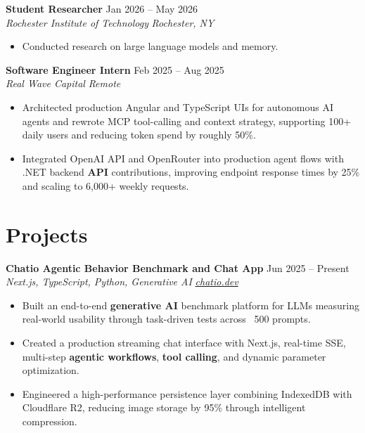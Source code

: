 \documentclass[10pt,letterpaper]{article}
\newif\ifresumeFirstRole
\newcommand{\resumeRole}[4]{%
  \ifresumeFirstRole
    \global\resumeFirstRolefalse
  \else
    \vspace{0pt plus 1fill}%
  \fi
  \textbf{#1} \hfill #2\\
  \textit{#3} \hfill \textit{#4}
}
\begin{document}
\resumeRole{Student Researcher}{Jan 2026 -- May 2026}{Rochester Institute of Technology}{Rochester, NY}
\begin{itemize}
  \item Conducted research on large language models and memory.
\end{itemize}

\resumeRole{Software Engineer Intern}{Feb 2025 -- Aug 2025}{Real Wave Capital}{Remote}
\begin{itemize}
  \item Architected production Angular and TypeScript UIs for autonomous AI agents and rewrote MCP tool-calling and context strategy, supporting 100+ daily users and reducing token spend by roughly 50\%.
  \item Integrated OpenAI API and OpenRouter into production agent flows with .NET backend \textbf{API} contributions, improving endpoint response times by 25\% and scaling to 6,000+ weekly requests.
\end{itemize}

\section*{Projects}
\resumeRole{Chatio Agentic Behavior Benchmark and Chat App}{Jun 2025 -- Present}{Next.js, TypeScript, Python, Generative AI}{\href{https://chatio.dev}{chatio.dev}}
\begin{itemize}
  \item Built an end-to-end \textbf{generative AI} benchmark platform for LLMs measuring real-world usability through task-driven tests across ~500 prompts.
  \item Created a production streaming chat interface with Next.js, real-time SSE, multi-step \textbf{agentic workflows}, \textbf{tool calling}, and dynamic parameter optimization.
  \item Engineered a high-performance persistence layer combining IndexedDB with Cloudflare R2, reducing image storage by 95\% through intelligent compression.
\end{itemize}
\end{document}
